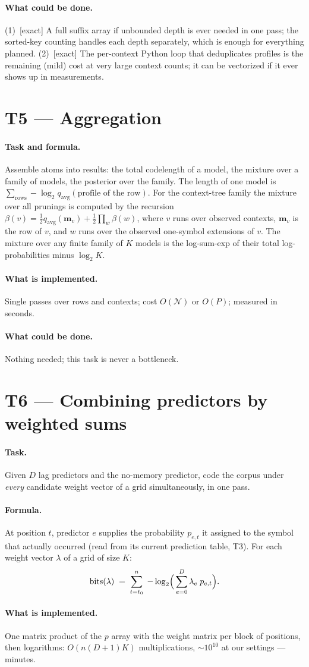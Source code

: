 \documentclass[11pt]{article}
\newcommand{\prof}{\mathbf{m}}
\newcommand{\field}[1]{\paragraph{#1.}}
\begin{document}
\field{What could be done}
(1)~[exact] A full suffix array if unbounded depth is ever needed in
one pass; the sorted-key counting handles each depth separately,
which is enough for everything planned.
(2)~[exact] The per-context Python loop that deduplicates profiles
is the remaining (mild) cost at very large context counts; it can be
vectorized if it ever shows up in measurements.

\section{T5 --- Aggregation}

\field{Task and formula}
Assemble atoms into results: the total codelength
of a model, the mixture over a family of models, the posterior over
the family.
The length of one model is $\sum_{\text{rows}} -\log_2
q_{\mathrm{avg}}(\text{profile of the row})$.  For the context-tree
family the mixture over all prunings is computed by the recursion
$\beta(v) = \frac12 q_{\mathrm{avg}}(\prof_v) + \frac12 \prod_{w}
\beta(w)$, where $v$ runs over observed contexts, $\prof_v$ is the
row of $v$, and $w$ runs over the observed one-symbol extensions of
$v$.  The mixture over any finite family of $K$ models is the
log-sum-exp of their total log-probabilities minus $\log_2 K$.

\field{What is implemented}
Single passes over rows and contexts; cost $O(\mathcal{N})$ or
$O(P)$; measured in seconds.

\field{What could be done}
Nothing needed; this task is never a bottleneck.

\section{T6 --- Combining predictors by weighted sums}

\field{Task}
Given $D$ lag predictors and the no-memory predictor, code the
corpus under \emph{every} candidate weight vector of a grid
simultaneously, in one pass.

\field{Formula}
At position $t$, predictor $e$ supplies the probability $p_{e,t}$
it assigned to the symbol that actually occurred (read from its
current prediction table, T3).  For each weight vector $\lambda$ of
a grid of size $K$:
\[
  \mathrm{bits}(\lambda) \;=\; \sum_{t = t_0}^{n}\; -\log_2
  \Bigl(\, \sum_{e=0}^{D} \lambda_e\; p_{e,t} \Bigr).
\]

\field{What is implemented}
One matrix product of the $p$ array with the weight matrix per block
of positions, then logarithms: $O(n (D+1) K)$ multiplications,
$\sim 10^{10}$ at our settings --- minutes.
\end{document}
